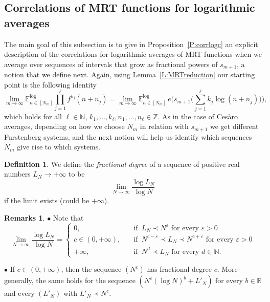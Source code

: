 \documentclass[11pt]{amsart}
\theoremstyle{definition}
\newtheorem{definition}{Definition}[section]
\newtheorem*{remarks}{Remarks}
\newcommand{\lE}{\mathbb{E}^{\log}}
\newcommand{\N}{{\mathbb N}}
\newcommand{\R}{{\mathbb R}}
\newcommand{\Z}{{\mathbb Z}}
\begin{document}
 \subsection{Correlations of MRT functions  for logarithmic averages} \label{SS:corrlog}
 The main goal of this subsection is to give in Proposition~\ref{P:corrlogc} an explicit description of the correlations for logarithmic averages of MRT functions when we average over sequences of intervals that grow as fractional powers of $s_{m+1}$, a notion that we define next.
  Again, using Lemma~\ref{L:MRTreduction} our starting point is the following identity
 \begin{equation}\label{E:corrflog}
 	\lim_{m\to \infty} 	\lE_{n\in[N_m]}\prod_{j=1}^\ell f^{k_j}(n+n_j)=
 	\lim_{m\to \infty} 	\lE_{n\in[N_m]}\, e\big(s_{m+1}\big(\sum_{j=1}^\ell k_j \log(n+n_j)\big)\big),
 \end{equation}
 which holds for all $\ell\in\N$, $k_1,\ldots, k_\ell, n_1,\ldots, n_\ell \in \Z$.
 As in the case of Ces\`aro averages,  depending on how we choose $N_m$ in relation with $s_{m+1}$ we get different Furstenberg systems, and the next notion will help us identify which sequences $N_m$ give rise to which systems.


 \begin{definition}\label{D:fracdeg}
 	We define the {\em fractional degree}  of a  sequence of positive real numbers $L_N\to +\infty$ to be
 	$$
 	\lim_{N\to\infty} \frac{\log{L_N}}{\log{N}}
 	$$
 	if the limit exists (could be $+\infty$).
\end{definition}
\begin{remarks}
	$\bullet$ Note that
	$$
	\lim_{N\to\infty} \frac{\log{L_N}}{\log{N}}=	\begin{cases}
		0, \quad &  \text{if }\,    L_N\prec N^\varepsilon \text{ for every } \varepsilon>0\\
		c\in (0,+\infty),\quad &   \text{if }\,   N^{c-\varepsilon}\prec  L_N\prec N^{c+\varepsilon} \text{ for every } \varepsilon>0\\
		+\infty, \quad &\text{if }\,  N^{d}\prec L_N \text{ for every } d\in \N.
	\end{cases}
	$$
	
	$\bullet$ If $c\in (0,+\infty)$, then the sequence $(N^c)$ has fractional  degree $c$.
More generally, 	the same  holds for the sequence $(N^c(\log{N})^b+L'_N)$ for every $b\in\R$ and every $(L'_N)$ with  $L'_N\prec N^c$.
\end{remarks}
\end{document}
